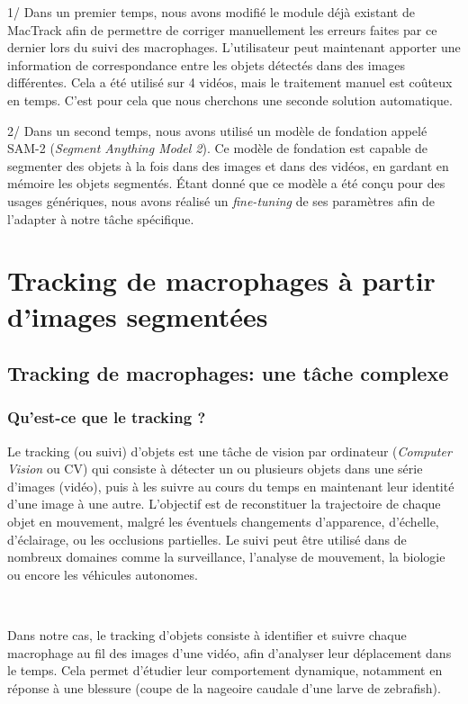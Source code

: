 \documentclass[a4paper,12pt]{report}
\begin{document}
1/ Dans un premier temps, nous avons modifié le module déjà existant de MacTrack afin de permettre de corriger manuellement les erreurs faites par ce dernier lors du suivi des macrophages. L'utilisateur peut maintenant apporter une information de correspondance entre les objets détectés dans des images différentes. Cela a été utilisé sur 4 vidéos, mais le traitement manuel est coûteux en temps. C'est pour cela que nous cherchons une seconde solution automatique.

2/ Dans un second temps, nous avons utilisé un modèle de fondation appelé SAM-2 (\textit{Segment Anything Model 2}). Ce modèle de fondation est capable de segmenter des objets à la fois dans des images et dans des vidéos, en gardant en mémoire les objets segmentés. Étant donné que ce modèle a été conçu pour des usages génériques, nous avons réalisé un \textit{fine-tuning} de ses paramètres afin de l'adapter à notre tâche spécifique.



\section{Tracking de macrophages à partir d'images segmentées}\label{track}


\subsection{Tracking de macrophages: une tâche complexe}
\subsubsection{Qu'est-ce que le tracking ?}
Le tracking (ou suivi) d'objets est une tâche de vision par ordinateur (\textit{Computer Vision} ou CV) qui consiste à détecter un ou plusieurs objets dans une série d'images (vidéo), puis à les suivre au cours du temps en maintenant leur identité d'une image à une autre. L'objectif est de reconstituer la trajectoire de chaque objet en mouvement, malgré les éventuels changements d'apparence, d'échelle, d'éclairage, ou les occlusions partielles. Le suivi peut être utilisé dans de nombreux domaines comme la surveillance, l'analyse de mouvement, la biologie ou encore les véhicules autonomes.

\

Dans notre cas, le tracking d'objets consiste à identifier et suivre chaque macrophage au fil des images d'une vidéo, afin d'analyser leur déplacement dans le temps. Cela permet d'étudier leur comportement dynamique, notamment en réponse à une blessure (coupe de la nageoire caudale d'une larve de zebrafish).
\end{document}
